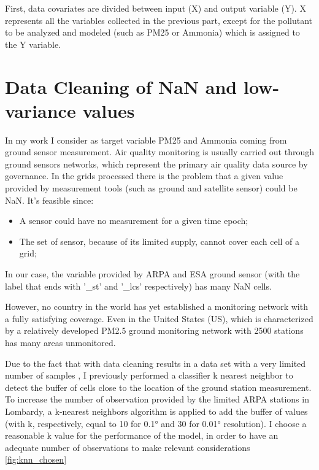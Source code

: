 First, data covariates are divided between input (X) and output variable (Y). X represents all the variables collected in the previous part, except for the pollutant to be analyzed and modeled (such as PM25 or Ammonia) which is assigned to the Y variable.


\section{Data Cleaning of NaN and low-variance values }
\label{subsec:nan}
In my work I consider as target variable PM25 and Ammonia coming from ground sensor measurement.
Air quality monitoring is usually carried out through ground sensors networks, which represent the primary air quality data source by governance. \newline
In the grids processed there is the problem that a given value provided by measurement tools (such as ground and satellite sensor) could be NaN. 
It's feasible since:
\begin{itemize}
\item A sensor could have no measurement for a given time epoch;
\item The set of sensor, because of its limited supply, cannot cover each cell of a grid;
\end{itemize}
In our case, the variable provided by ARPA and ESA ground sensor (with the label that ends with '\_st' and '\_lcs' respectively) has many NaN cells.
\par
However, no country in the world has yet established a monitoring network with a fully satisfying coverage\cite{liu2018improve}. Even in the United States (US), which is characterized by a relatively developed PM2.5 ground monitoring network with 2500 stations has many areas unmonitored\cite{liu2018improve}. \par
Due to the fact that with data cleaning results in a data set with a very limited number of samples \cite{zhang2018strategy}, I previously performed a classifier k nearest neighbor\cite{taunk2019brief} to detect the buffer of cells close to the location of the ground station measurement. To increase the number of observation provided by the limited ARPA stations in Lombardy, a k-nearest neighbors algorithm is applied to add the buffer of values (with k, respectively, equal to 10 for 0.1° and 30 for 0.01° resolution).  
I choose a reasonable k value for the performance of the model, in order to have an adequate number of observations to make relevant considerations \ref{fig:knn_chosen}

